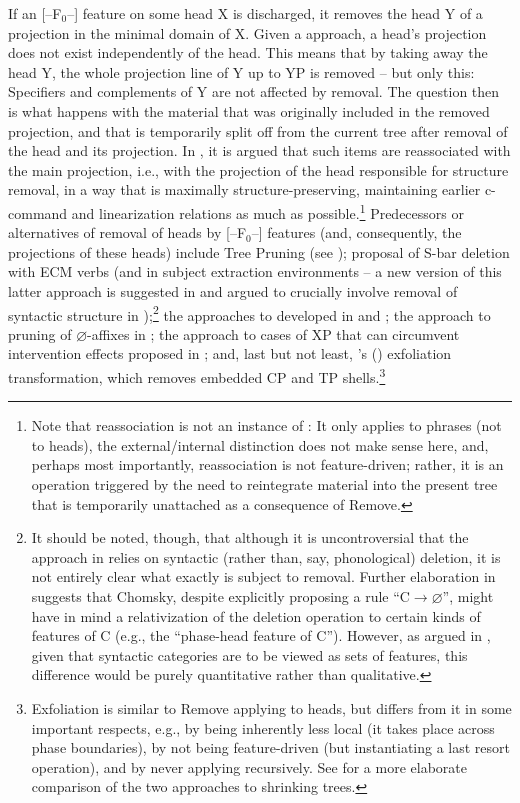\documentclass[output=paper]{langsci/langscibook}
\newcommand{\scite}[2]{\citeauthor{#2}#1 (\citeyear{#2})}
\begin{document}
If an [--F$_0$--] feature on some head X is discharged, it removes the head Y
of a projection in the minimal domain of X. Given a 
approach, a head's projection does not exist independently of the head. This
means that by taking away the head Y, the whole projection line of Y up to YP
is removed -- but only this: Specifiers and complements of Y are not affected
by removal.  The question then is what happens with the material that was
originally included in the removed projection, and that is temporarily split
off from the current tree after removal of the head and its projection. In
\cite{Mueller:17:pre}, it is argued that such items are reassociated with the
main projection, i.e., with the projection of the head responsible for
structure removal, in a way that is maximally structure-preserving, maintaining
earlier c-command and linearization relations as much as
possible.\footnote{Note that reassociation is not an instance of : It only
    applies to phrases (not to heads), the external/internal distinction does
    not make sense here, and, perhaps most importantly, reassociation is not
    feature-driven; rather, it is an operation triggered by the need to
reintegrate material into the present tree that is temporarily unattached as a
consequence of Remove.} Predecessors or alternatives of removal of heads by
[--F$_0$--] features (and, consequently, the projections of these heads)
include Tree Pruning (see \citealt[Ch.~3]{Ross:67}); 
proposal of S-bar deletion with ECM verbs (and in subject extraction
environments -- a new version of this latter approach is suggested in
\citealt[24]{Chomsky:15} and argued to crucially involve removal of syntactic
structure in \citealt{Hornstein:14:fac});\footnote{It should be noted, though,
    that although it is uncontroversial that the approach in \cite{Chomsky:15}
    relies on syntactic (rather than, say, phonological) deletion, it is not
    entirely clear what exactly is subject to removal. Further elaboration in
    \cite{Chomsky2015} suggests that Chomsky, despite explicitly proposing a
    rule ``C$\rightarrow\varnothing$'', might have in mind a relativization of the
    deletion operation to certain kinds of features of C  (e.g., the
``phase-head feature of C''). However, as argued in \cite{Mueller:17:fdm},
given that syntactic categories are to be viewed as sets of features, this
difference would be purely quantitative rather than qualitative.} the
approaches to  developed in \cite{Heycock&Kroch:94} and
\cite{Stepanov:12};  the approach to pruning of $\varnothing$-affixes in
\cite{Embick:10}; the approach to cases of XP  that can circumvent
intervention effects proposed in \cite{Heck:16}; and, last but not least,
\scite{'s}{Pesetsky:16} exfoliation transformation, which removes embedded CP
and TP shells.\footnote{Exfoliation is similar to Remove applying to heads, but
    differs from it in some important respects, e.g., by being inherently less
    local (it takes place across phase boundaries), by not being feature-driven
    (but instantiating a last resort operation), and by never applying
recursively.  See \cite{Mueller:17:pre} for a more elaborate comparison of the
two approaches to shrinking trees.}
\end{document}
